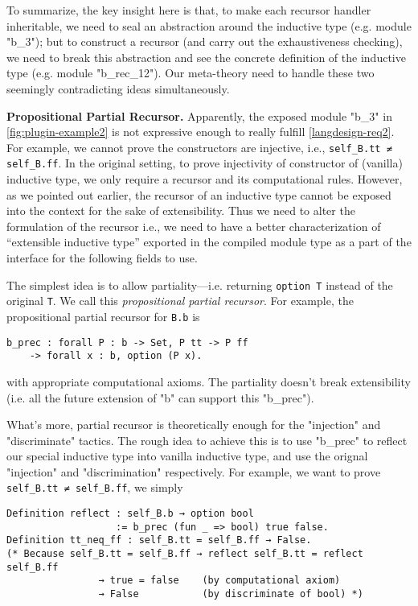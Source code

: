 To summarize, the key insight here is that, to make each recursor
handler inheritable, we need to seal an abstraction around the inductive
type (e.g. module "b_3"); but to construct a recursor (and carry out the
exhaustiveness checking), we need to break this abstraction and see the
concrete definition of the inductive type (e.g. module "b_rec_12"). Our
meta-theory need to handle these two seemingly contradicting ideas
simultaneously. 


\textbf{Propositional Partial Recursor.}
Apparently, the exposed module "b_3" in \cref{fig:plugin-example2} is
not expressive enough to really fulfill \ref{langdesign-req2}. For
example, we cannot prove the constructors are injective, i.e.,
\texttt{self_B.tt ≠ self_B.ff}. In the original setting, to
prove injectivity of constructor of (vanilla) inductive type, we only
require a recursor and its computational rules. However, as we pointed
out earlier, the recursor of an inductive type cannot be exposed into
the context for the sake of extensibility. Thus we need to alter the
formulation of the recursor i.e., we need to have a better
characterization of ``extensible inductive type'' exported in the
compiled module type as a part of the interface for the following fields
to use.


The simplest idea is to allow partiality---i.e. returning \texttt{option T} instead of the original \texttt{T}. We call this \textit{propositional partial recursor}. For example, the propositional partial recursor for \texttt{B.b} is 
\begin{verbatim}
b_prec : forall P : b -> Set, P tt -> P ff 
    -> forall x : b, option (P x). 
\end{verbatim}
with appropriate computational axioms. The partiality doesn't break extensibility (i.e. all the future extension of "b" can support this "b_prec"). 

What's more, partial recursor is theoretically enough for the "injection" and "discriminate" tactics. The rough idea to achieve this is to use "b_prec" to reflect our special inductive type into vanilla inductive type, and use the orignal "injection" and "discrimination" respectively. For example, we want to prove \texttt{self_B.tt ≠ self_B.ff}, we simply 
\begin{verbatim}
Definition reflect : self_B.b → option bool 
                   := b_prec (fun _ => bool) true false.
Definition tt_neq_ff : self_B.tt = self_B.ff → False.
(* Because self_B.tt = self_B.ff → reflect self_B.tt = reflect self_B.ff 
                → true = false    (by computational axiom)
                → False           (by discriminate of bool) *)
\end{verbatim}



